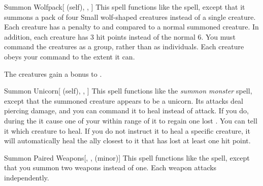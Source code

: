 \lowercase{\hypertarget{spell:Summon Wolfpack}{}}\label{spell:Summon Wolfpack}
\begin{attuneability}[Rank 5]{\hypertarget{spell:Summon Wolfpack}{Summon Wolfpack}}[ (self), , ]
This spell functions like the  spell, except that it summons a pack of four Small wolf-shaped creatures instead of a single creature.
Each creature has a  penalty to  and  compared to a normal summoned creature.
In addition, each creature has 3 hit points instead of the normal 6.
You must command the creatures as a group, rather than as individuals.
Each creature obeys your command to the extent it can.

\rankline
{} The creatures gain a  bonus to .
\end{attuneability}
\vspace{0.25em}



\lowercase{\hypertarget{spell:Summon Unicorn}{}}\label{spell:Summon Unicorn}
\begin{attuneability}[Rank 6]{\hypertarget{spell:Summon Unicorn}{Summon Unicorn}}[ (self), , ]
This spell functions like the \textit{summon monster} spell, except that the summoned creature appears to be a unicorn.
Its attacks deal piercing damage, and you can command it to heal instead of attack.
If you do, during the  it cause one of your  within \rngclose range of it to regain one lost .
You can tell it which creature to heal.
If you do not instruct it to heal a specific creature, it will automatically heal the ally closest to it that has lost at least one hit point.
\end{attuneability}
\vspace{0.25em}



\lowercase{\hypertarget{spell:Summon Paired Weapons}{}}\label{spell:Summon Paired Weapons}
\begin{freeability}[Rank 8]{\hypertarget{spell:Summon Paired Weapons}{Summon Paired Weapons}}[, ,  (minor)]
This spell functions like the  spell, except that you summon two weapons instead of one.
Each weapon attacks independently.
\end{freeability}
\vspace{0.25em}




